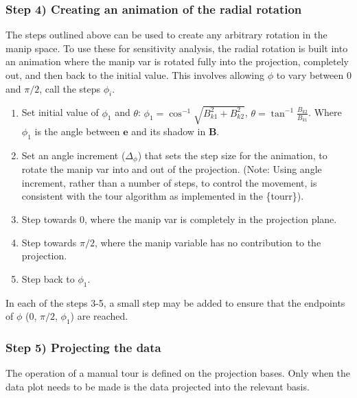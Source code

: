 \documentclass{template/monashthesis}
\begin{document}
\hypertarget{step-4-creating-an-animation-of-the-radial-rotation}{%
\subsubsection{Step 4) Creating an animation of the radial rotation}\label{step-4-creating-an-animation-of-the-radial-rotation}}

The steps outlined above can be used to create any arbitrary rotation in the manip space. To use these for sensitivity analysis, the radial rotation is built into an animation where the manip var is rotated fully into the projection, completely out, and then back to the initial value. This involves allowing \(\phi\) to vary between \(0\) and \(\pi/2\), call the steps \(\phi_i\).

\begin{enumerate}
\def\labelenumi{\arabic{enumi}.}
\tightlist
\item
  Set initial value of \(\phi_1\) and \(\theta\): \(\phi_1 = \cos^{-1}{\sqrt{B_{k1}^2+B_{k2}^2}}\), \(\theta = \tan^{-1}\frac{B_{k2}}{B_{k1}}\). Where \(\phi_1\) is the angle between \(\textbf{e}\) and its shadow in \(\textbf{B}\).
\item
  Set an angle increment (\(\Delta_\phi\)) that sets the step size for the animation, to rotate the manip var into and out of the projection. (Note: Using angle increment, rather than a number of steps, to control the movement, is consistent with the tour algorithm as implemented in the \{tourr\}).
\item
  Step towards \(0\), where the manip var is completely in the projection plane.
\item
  Step towards \(\pi/2\), where the manip variable has no contribution to the projection.
\item
  Step back to \(\phi_1\).
\end{enumerate}

In each of the steps 3-5, a small step may be added to ensure that the endpoints of \(\phi\) (\(0\), \(\pi/2\), \(\phi_1\)) are reached.

\hypertarget{sec:display}{%
\subsubsection{Step 5) Projecting the data}\label{sec:display}}

The operation of a manual tour is defined on the projection bases. Only when the data plot needs to be made is the data projected into the relevant basis.
\end{document}
